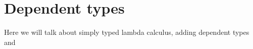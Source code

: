 \section{Dependent types}

Here we will talk about simply typed lambda calculus, adding dependent types and 
